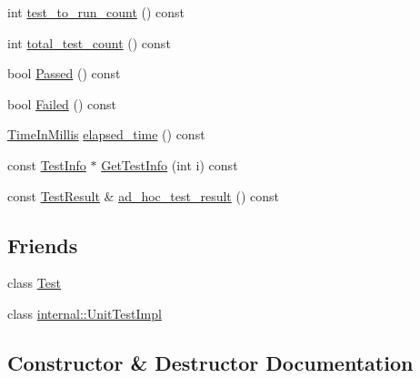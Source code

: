 \begin{DoxyCompactItemize}
\item 
int \hyperlink{classtesting_1_1_test_case_a57f115315eb756e23be6651bb5e6c638}{test\+\_\+to\+\_\+run\+\_\+count} () const
\item 
int \hyperlink{classtesting_1_1_test_case_aba3cab19aaf7295284f0832f2cf895a3}{total\+\_\+test\+\_\+count} () const
\item 
bool \hyperlink{classtesting_1_1_test_case_a29bbfd227b732a90198b5280c039c271}{Passed} () const
\item 
bool \hyperlink{classtesting_1_1_test_case_ae71c30eab6f1673b82090a0e745c2aa5}{Failed} () const
\item 
\hyperlink{namespacetesting_a992de1d091ce660f451d1e8b3ce30fd6}{Time\+In\+Millis} \hyperlink{classtesting_1_1_test_case_acd7d6a77bce06da6ef90f5dad1c4def1}{elapsed\+\_\+time} () const
\item 
const \hyperlink{classtesting_1_1_test_info}{Test\+Info} $\ast$ \hyperlink{classtesting_1_1_test_case_a441e0eca232643671dc365c2924c255c}{Get\+Test\+Info} (int i) const
\item 
const \hyperlink{classtesting_1_1_test_result}{Test\+Result} \& \hyperlink{classtesting_1_1_test_case_a6d5fc5003bc3352f3ddae7dadc6d2364}{ad\+\_\+hoc\+\_\+test\+\_\+result} () const
\end{DoxyCompactItemize}
\subsection*{Friends}
\begin{DoxyCompactItemize}
\item 
class \hyperlink{classtesting_1_1_test_case_a5b78b1c2e1fa07ffed92da365593eaa4}{Test}
\item 
class \hyperlink{classtesting_1_1_test_case_acc0a5e7573fd6ae7ad1878613bb86853}{internal\+::\+Unit\+Test\+Impl}
\end{DoxyCompactItemize}


\subsection{Constructor \& Destructor Documentation}
\mbox{\label{classtesting_1_1_test_case_a8a43b04703bfc7d56597fcb9b76ffbf5}} 
